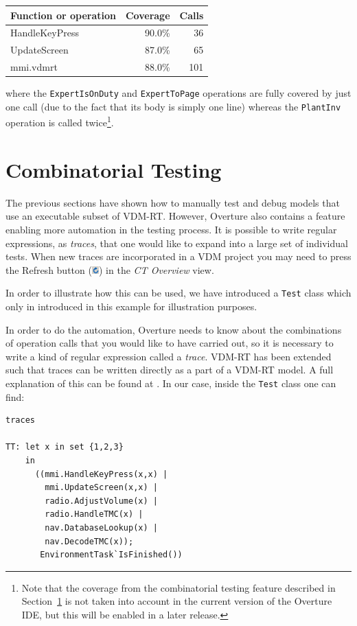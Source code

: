 \begin{longtable}{|l|r|r|}
\hline
Function or operation & Coverage & Calls \\
\hline
\hline
HandleKeyPress & 90.0\% & 36 \\
\hline
UpdateScreen & 87.0\% & 65 \\
\hline
\hline
mmi.vdmrt & 88.0\% & 101 \\
\hline
\end{longtable}

\noindent where the \texttt{ExpertIsOnDuty} and \texttt{ExpertToPage}
operations are fully covered by just one call (due to the fact that
its body is simply one line) whereas the \texttt{PlantInv} operation
is called twice\footnote{Note that the coverage from the combinatorial
  testing feature described in Section~\ref{sec:CT} is not taken into
  account in the current version of the Overture IDE, but this will be
  enabled in a later release.}.

\section{Combinatorial Testing}\label{sec:CT}

The previous sections have shown how to manually test and debug models
that use an executable subset of VDM-RT. However, Overture also
contains a feature enabling more automation in the testing process. It
is possible to write regular expressions, as \emph{traces}, that one
would like to expand into a large set of individual tests. When new
traces are incorporated in a VDM project you may need to press the
\textsf{Refresh} button
(\includegraphics[width=0.02\textwidth]{figures/refresh}) in the
\emph{CT Overview} view.

In order to illustrate how this can be used, we have introduced a
\texttt{Test} class which only in introduced in this example for
illustration purposes.

In order to do the automation, Overture needs to know about the
combinations of operation calls that you would like to have carried
out, so it is necessary to write a kind of regular expression called a
\emph{trace}. VDM-RT has been extended such that traces can be written
directly as a part of a VDM-RT model. A full explanation of this can be
found at \cite{Larsen&09d}. In our case, inside the \texttt{Test}
class one can find:

\begin{lstlisting}
traces

TT: let x in set {1,2,3}
    in
      ((mmi.HandleKeyPress(x,x) | 
        mmi.UpdateScreen(x,x) | 
        radio.AdjustVolume(x) |
        radio.HandleTMC(x) |
        nav.DatabaseLookup(x) |
        nav.DecodeTMC(x));
       EnvironmentTask`IsFinished())
 \end{lstlisting}

